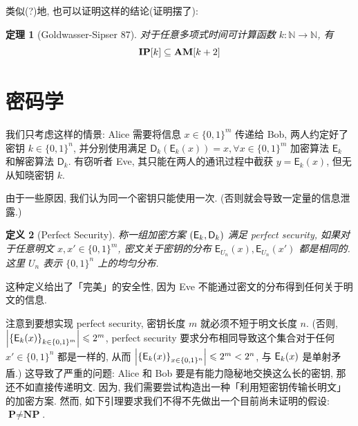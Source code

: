 \documentclass[8pt]{article}
\theoremstyle{compact}
\newtheorem{theorem}{定理}[section]
\newtheorem{definition}[theorem]{定义}
\def\le{\leqslant}
\def\P{\textbf{P}}
\def\NP{\textbf{NP}}
\begin{document}
类似(?)地, 也可以证明这样的结论(证明摆了): \begin{theorem}[Goldwasser-Sipser 87]
	对于任意多项式时间可计算函数 $k: \mathbb N \to \mathbb N$, 有 $$\textbf{IP}[k] \subseteq \textbf{AM}[k+2]$$
\end{theorem}

\newpage
\section{密码学}
我们只考虑这样的情景: Alice 需要将信息 $x \in \{0, 1\}^m$ 传递给 Bob, 两人约定好了密钥 $k \in \{0, 1\}^n$, 并分别使用满足 $\textsf{D}_k(\textsf{E}_k(x)) = x, \forall x \in \{0, 1\}^m$ 加密算法 $\textsf{E}_k$ 和解密算法 $\textsf{D}_k$. 有窃听者 Eve, 其只能在两人的通讯过程中截获 $y = \textsf{E}_k(x)$, 但无从知晓密钥 $k$.

由于一些原因, 我们认为同一个密钥只能使用一次. (否则就会导致一定量的信息泄露.)

\begin{definition}[Perfect Security]
	称一组加密方案 $(\textsf E_k, \textsf D_k)$ 满足 perfect security, 如果对于任意明文 $x, x' \in \{0, 1\}^m$, 密文关于密钥的分布 $\textsf{E}_{U_n}(x), \textsf{E}_{U_n}(x')$ 都是相同的. 这里 $U_n$ 表示 $\{0, 1\}^n$ 上的均匀分布.
\end{definition}

这种定义给出了「完美」的安全性, 因为 Eve 不能通过密文的分布得到任何关于明文的信息.

注意到要想实现 perfect security, 密钥长度 $m$ 就必须不短于明文长度 $n$. (否则, $\left|\left\{\textsf E_k(x)\right\}_{k \in \{0, 1\}^m}\right| \le 2^m$, perfect security 要求分布相同导致这个集合对于任何 $x' \in \{0, 1\}^n$ 都是一样的, 从而 $\left|\left\{\textsf E_k(x)\right\}_{x \in \{0, 1\}^n}\right| \le 2^m < 2^n$, 与 $\textsf E_k(x)$ 是单射矛盾.) 这导致了严重的问题: Alice 和 Bob 要是有能力隐秘地交换这么长的密钥, 那还不如直接传递明文. 因为, 我们需要尝试构造出一种「利用短密钥传输长明文」的加密方案. 然而, 如下引理要求我们不得不先做出一个目前尚未证明的假设: $\P \neq \NP$.
\end{document}
